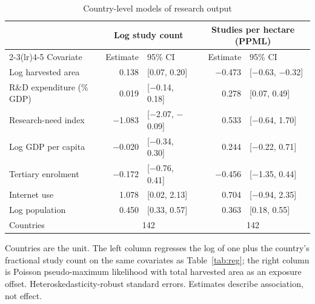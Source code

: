 \begin{table}[!t]
\centering
\caption{Country-level models of research output}
\label{tab:countrylevel}
\begin{tabular*}{\textwidth}{@{\extracolsep\fill}l r@{\hspace{6pt}}l r@{\hspace{6pt}}l@{}}
\toprule
& \multicolumn{2}{c}{Log study count} & \multicolumn{2}{c}{Studies per hectare (PPML)} \\
\cmidrule(lr){2-3}\cmidrule(lr){4-5}
Covariate & Estimate & 95\% CI & Estimate & 95\% CI \\
\midrule
Log harvested area & 0.138 & [0.07, 0.20] & $-$0.473 & [$-$0.63, $-$0.32] \\
R\&D expenditure (\% GDP) & 0.019 & [$-$0.14, 0.18] & 0.278 & [0.07, 0.49] \\
Research-need index & $-$1.083 & [$-$2.07, $-$0.09] & 0.533 & [$-$0.64, 1.70] \\
Log GDP per capita & $-$0.020 & [$-$0.34, 0.30] & 0.244 & [$-$0.22, 0.71] \\
Tertiary enrolment & $-$0.172 & [$-$0.76, 0.41] & $-$0.456 & [$-$1.35, 0.44] \\
Internet use & 1.078 & [0.02, 2.13] & 0.704 & [$-$0.94, 2.35] \\
Log population & 0.450 & [0.33, 0.57] & 0.363 & [0.18, 0.55] \\
\midrule
Countries & \multicolumn{2}{c}{142} & \multicolumn{2}{c}{142} \\
\bottomrule
\end{tabular*}
\begin{tablenotes}
\item[] Countries are the unit. The left column regresses the log of one plus the country's fractional study count on the same covariates as Table~\ref{tab:reg}; the right column is Poisson pseudo-maximum likelihood with total harvested area as an exposure offset. Heteroskedasticity-robust standard errors. Estimates describe association, not effect.
\end{tablenotes}
\end{table}
